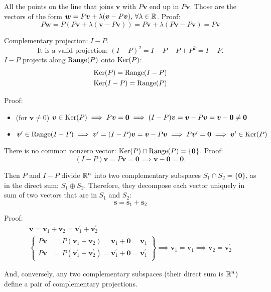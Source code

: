 \documentclass[
  12pt,
  paper=a4,
]{scrartcl} %
\begin{document}
All the points on the line that joins $\bm v$ with $P\bm v$ end up in $P\bm v$. Those are the vectors of the form $\bm w = P \bm v + \lambda (\bm v - P\bm v),\, \forall \lambda\in\mathbb R$. Proof: 
\[
P\bm w =
    P(P \bm v + \lambda (\bm v - P\bm v))
    = P \bm v + \lambda (P\bm v - P\bm v)
    = P \bm v
\]

Complementary projection: $I-P$.
\[
    \text{It is a valid projection: $(I-P)^2 = I-P-P+P^2 = I-P$.}
\]
$I-P$ projects along $\operatorname{Range}(P)$ onto $\operatorname{Ker}(P)$:
\begin{gather*}
\operatorname{Ker}(P) = \operatorname{Range}(I-P) \\
\operatorname{Ker}(I-P) = \operatorname{Range}(P)
\end{gather*}

Proof:
\begin{itemize}
    \item (for $\bm v\neq 0$) $\bm v \in \operatorname{Ker}(P) \implies P\bm v = \bm 0 \implies
    (I-P)\bm v = \bm v - P\bm v= \bm v - \bm 0\neq \bm 0$
    \item $\bm v^\prime\in \operatorname{Range}(I-P) \implies \bm v^\prime = (I-P)\bm v = \bm v - P\bm v \implies P \bm v^\prime = \bm 0 \implies \bm v^\prime \in \operatorname{Ker}(P)$
\end{itemize}

There is no common nonzero vector: $\operatorname{Ker}(P)\cap\operatorname{Range}(P) = \{\bm 0\}$. Proof: \[(I-P)\bm v = P\bm v = \bm 0 \implies \bm v - \bm 0 = \bm 0.\]

Then $P$ and $I-P$ divide $\mathbb R^n$ into two complementary subspaces $S_1 \cap S_2 = \{\bm 0\}$, as in the direct sum: $S_1 \oplus S_2$. Therefore, they decompose each vector uniquely in sum of two vectors that are in $S_1$ and $S_2$: \[\bm s = \bm s_1 + \bm s_2\]

Proof:
\begin{gather*}
   \bm v = \bm v_1 +\bm v_2  = \bm v_1^\prime + \bm v_2^\prime 
   \\
   \left\{
   \begin{aligned}
        P\bm v &= P(\bm v_1 +\bm v_2) =  \bm v_1 + \bm 0 = \bm v_1
        \\
        P\bm v &= P(\bm v_1^\prime + \bm v_2^\prime ) =  \bm v_1^\prime + \bm 0 = \bm v_1^\prime
   \end{aligned}
   \right\}
   \implies  \bm v_1  = \bm v_1^\prime 
   \implies \bm v_2  = \bm v_2^\prime 
\end{gather*}

And, conversely, any two complementary subspaces (their direct sum is $\mathbb R^n$) define a pair of complementary projections.
\end{document}
